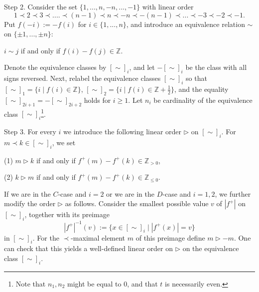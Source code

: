 \documentclass{emsprocart}
\begin{document}
Step 2. Consider the set $\{1,..., n, -n,..., -1\}$ with linear order
\begin{equation}1\prec 2\prec 3\prec....\prec (n-1)\prec n\prec -n\prec -(n-1)\prec...\prec-3\prec-2\prec -1.\label{ES1n}\end{equation}
Put $f(-i):=-f(i)$ for $i\in\{1,..., n\}$, and introduce an equivalence relation $\sim$ on $\{\pm1,..., \pm n\}$:
\begin{center}$i\sim j$ if and only if $f(i)-f(j)\in\mathbb Z$.\end{center}
Denote the equivalence classes by $[\sim]_i$, and let $-[\sim]_i$ be the class with all signs reversed. 
Next, relabel the equivalence classes $[\sim]_i$ so that $[\sim]_1=\{i\mid f(i)\in\mathbb Z\}$, $[\sim]_2=\{i\mid f(i)\in\mathbb Z+\frac12\}$, and the equality $[\sim]_{2i+1}=-[\sim]_{2i+2}$ holds for $i\ge1$.
Let $n_i$ be cardinality of the equivalence class $[\sim]_i$\footnote{Note that $n_1, n_2$ might be equal to 0, and that $t$ is necessarily even.}.



Step 3. For every $i$ we introduce the following linear order $\triangleright$ on $[\sim]_i$. For $m\prec k\in [\sim]_i$, we 
set

(1) $m\triangleright k$ if and only if $f^+(m)-f^+(k)\in\mathbb Z_{>0}$,

(2) $k\triangleright m$ if and only if $f^+(m)-f^+(k)\in\mathbb Z_{\le0}$.

If we are in the $C$-case and $i=2$ or we are in the $D$-case and $i=1, 2$, we further modify the order $\triangleright$ as follows.
Consider the smallest possible value $v$ of $|f^+|$ on $[\sim]_i$, together with 
its preimage $$|f^+|^{-1}(v):=\{x\in [\sim]_i\mid |f^+(x)|=v\}$$ in $[\sim]_i$. For the $\prec$-maximal element $m$ of this preimage define $m\triangleright -m$. One can check that this yields a well-defined linear order on $\triangleright$ on the equivalence class $[\sim]_i$.

\end{document}
